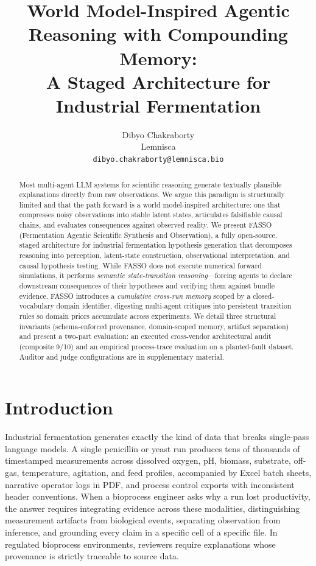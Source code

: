 \documentclass[11pt]{article}
\title{World Model-Inspired Agentic Reasoning with Compounding Memory:\\
  A Staged Architecture for Industrial Fermentation}
\author{
  Dibyo Chakraborty \\
  Lemnisca \\
  \texttt{dibyo.chakraborty@lemnisca.bio}
}
\begin{document}
\linespread{0.95}\selectfont

\maketitle

\begin{abstract}
Most multi-agent LLM systems for scientific reasoning generate textually plausible explanations directly from raw observations. We argue this paradigm is structurally limited and that the path forward is a world model-inspired architecture: one that compresses noisy observations into stable latent states, articulates falsifiable causal chains, and evaluates consequences against observed reality. We present FASSO (Fermentation Agentic Scientific Synthesis and Observation), a fully open-source, staged architecture for industrial fermentation hypothesis generation that decomposes reasoning into perception, latent-state construction, observational interpretation, and causal hypothesis testing. While FASSO does not execute numerical forward simulations, it performs \emph{semantic state-transition reasoning}—forcing agents to declare downstream consequences of their hypotheses and verifying them against bundle evidence. FASSO introduces a \emph{cumulative cross-run memory} scoped by a closed-vocabulary domain identifier, digesting multi-agent critiques into persistent transition rules so domain priors accumulate across experiments. We detail three structural invariants (schema-enforced provenance, domain-scoped memory, artifact separation) and present a two-part evaluation: an executed cross-vendor architectural audit (composite 9/10) and an empirical process-trace evaluation on a planted-fault dataset. Auditor and judge configurations are in supplementary material.
\end{abstract}

\section{Introduction}

Industrial fermentation generates exactly the kind of data that breaks single-pass language models. A single penicillin or yeast run produces tens of thousands of timestamped measurements across dissolved oxygen, pH, biomass, substrate, off-gas, temperature, agitation, and feed profiles, accompanied by Excel batch sheets, narrative operator logs in PDF, and process control exports with inconsistent header conventions. When a bioprocess engineer asks why a run lost productivity, the answer requires integrating evidence across these modalities, distinguishing measurement artifacts from biological events, separating observation from inference, and grounding every claim in a specific cell of a specific file. In regulated bioprocess environments, reviewers require explanations whose provenance is strictly traceable to source data.
\end{document}
